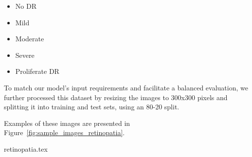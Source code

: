 \begin{itemize}
  \item No DR
  \item Mild
  \item Moderate
  \item Severe
  \item Proliferate DR
\end{itemize}

To match our model's input requirements and facilitate a balanced evaluation, we further processed this dataset by resizing the images to 300x300 pixels and splitting it into training and test sets, using an 80-20 split.

Examples of these images are presented in Figure~\ref{fig:sample_images_retinopatia}.

{retinopatia.tex}
